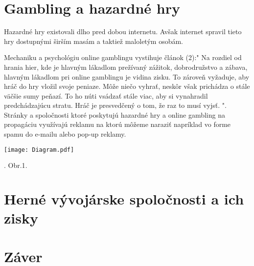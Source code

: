 \documentclass[10pt,twoside,slovak,a4paper]{article}
\begin{document}
\section{Gambling a hazardné hry} 

Hazardné hry existovali dlho pred dobou internetu. Avšak internet spravil tieto hry dostupnými širším masám a taktiež maloletým osobám. 

Mechaniku a psychológiu online gamblingu vystihuje článok (2):" Na rozdiel od hrania hier, kde je hlavným lákadlom prežívaný zážitok, dobrodružstvo a zábava, hlavným lákadlom pri online gamblingu je vidina zisku. To zároveň vyžaduje, aby hráč do hry vložil svoje peniaze. Môže niečo vyhrať, neskôr však prichádza o stále väčšie sumy peňazí. To ho núti vsádzať stále viac, aby si vynahradil predchádzajúcu stratu. Hráč je presvedčený o tom, že raz to musí vyjsť. "\cite{CL2}. Stránky a spoločnosti ktoré poskytujú hazardné hry a online gambling na propagáciu využívajú reklamu na ktorú môžeme naraziť napríklad vo forme spamu do e-mailu alebo pop-up reklamy.

\texttt{[image: Diagram.pdf]}

\cite{CL3}. Obr.1\cite{Obr1}. 


\section{Herné vývojárske spoločnosti a ich zisky} 



\section{Záver} \label{zaver} %





\end{document}
